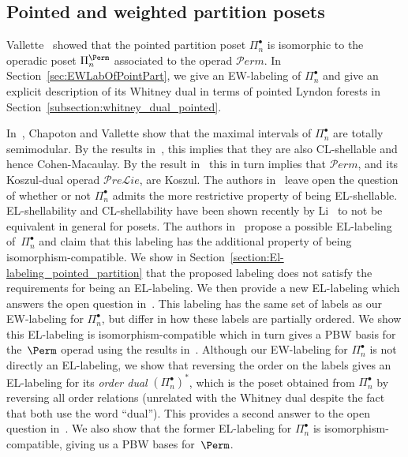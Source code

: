 \subsection{Pointed and weighted partition posets} 



  Vallette~\cite{Vallette2007} showed that the pointed partition poset $\Pi_{n}^{\bullet}$ is isomorphic to the operadic poset $\Pi_n^{\Perm}$  associated to the operad $\mathcal{P}erm$. In Section~\ref{sec:EWLabOfPointPart}, we give an EW-labeling of $\Pi_n^\bullet$ and give an explicit description of its Whitney dual in terms of pointed Lyndon forests in Section~\ref{subsection:whitney_dual_pointed}. 
   
  
  
  In~\cite{ChapotonVallete2006}, Chapoton and Vallette show that the maximal intervals of  $\Pi_{n}^{\bullet}$ are totally semimodular. By the results in~\cite{BjornerWachs1983}, this implies that they are also CL-shellable and hence Cohen-Macaulay. By the result in~\cite{Vallette2007} this in turn implies that  $\mathcal{P}erm$, and its Koszul-dual operad $\mathcal{P}re\mathcal{L}ie$, are Koszul.  The authors in~\cite{ChapotonVallete2006} leave  open the question of whether or not $\Pi_{n}^{\bullet}$ admits the more restrictive property of being EL-shellable. EL-shellability and CL-shellability have been shown recently by Li~\cite{Tiansi2020} to not be equivalent in general for posets. The authors in~\cite{BelliermillesDelcroixogerHoffbeck2021} propose a possible EL-labeling of~$\Pi_{n}^{\bullet}$ and claim that this labeling has the additional property of being isomorphism-compatible. We show in Section~\ref{section:El-labeling_pointed_partition} that the proposed labeling does not satisfy the requirements for being an EL-labeling. We then provide a new EL-labeling which answers the open question in~\cite{ChapotonVallete2006}. This labeling has the same set of labels as our EW-labeling for $\Pi_{n}^{\bullet}$, but differ in how these labels are partially ordered. We show this EL-labeling is isomorphism-compatible which in turn gives a PBW basis for the~$\Perm$ operad using the results in~\cite{BelliermillesDelcroixogerHoffbeck2021}. Although our EW-labeling for $\Pi_{n}^{\bullet}$ is not directly an EL-labeling, we show that reversing the order on the labels gives an EL-labeling for its \emph{order dual} $(\Pi_{n}^{\bullet})^{*}$, which is the poset obtained from $\Pi_{n}^{\bullet}$ by reversing all order relations (unrelated with the Whitney dual despite the fact that both use the word ``dual'').    This provides a second answer to the open question in~\cite{ChapotonVallete2006}.  We also show that the former EL-labeling for $\Pi_{n}^{\bullet}$  is isomorphism-compatible, giving us a PBW bases for~$\Perm$.

